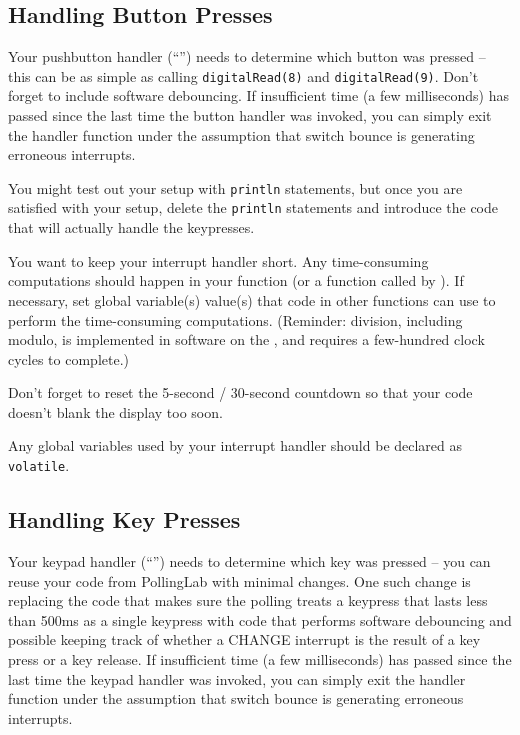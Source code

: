 \subsection{Handling Button Presses}

Your pushbutton handler (``'') needs to
determine which button was pressed -- this can be as simple as calling
\lstinline{digitalRead(8)} and \lstinline{digitalRead(9)}. Don't forget to
include software debouncing. If insufficient time (a few milliseconds) has
passed since the last time the button handler was invoked, you can simply exit
the handler function under the assumption that switch bounce is generating
erroneous interrupts.

You might test out your setup with \lstinline{println} statements, but once you
are satisfied with your setup, delete the \lstinline{println} statements and
introduce the code that will actually handle the keypresses.

You want to keep your interrupt handler short. Any time-consuming computations
should happen in your  function (or a function called by
). If necessary, set global variable(s) value(s) that code in
other functions can use to perform the time-consuming computations. (Reminder:
division, including modulo, is implemented in software on the \nano, and
requires a few-hundred clock cycles to complete.)

Don't forget to reset the 5-second / 30-second countdown so that your code
doesn't blank the display too soon.

Any global variables used by your interrupt handler should be declared as
\lstinline{volatile}.

\subsection{Handling Key Presses}

Your keypad handler (``'') needs to
determine which key was pressed -- you can reuse your
 code from PollingLab with minimal changes. One
such change is replacing the code that makes sure the polling treats a keypress
that lasts less than 500ms as a single keypress with code that performs
software debouncing and possible keeping track of whether a CHANGE interrupt is
the result of a key press or a key release. If insufficient time (a few
milliseconds) has passed since the last time the keypad handler was invoked,
you can simply exit the handler function under the assumption that switch
bounce is generating erroneous interrupts.

